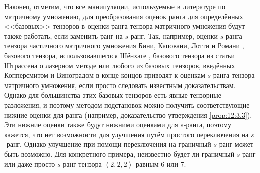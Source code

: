 Наконец, отметим, что все манипуляции, используемые в литературе по матричному умножению, для преобразования оценок ранга для определённых <<базовых>> тензоров в оценки ранга тензора матричного умножения будут также работать, если заменить ранг на $s$-ранг. Так, например, оценки $s$-ранга тензора частичного матричного умножения Бини, Каповани, Лотти и Романи \cite{Bini}, базового тензора, использовавшегося Шёнхаге \cite{Schonhage81}, базового тензора из статьи Штрассена о лазерном методе \cite{Strassen1987} или любого из базовых тензоров, введённых Копперсмитом и Виноградом \cite{Coppersmith:1990} в конце концов приводят к оценкам $s$-ранга тензора матричного умножения, если просто следовать известным доказательствам. Однако для большинства этих базовых тензоров есть явные тензорные разложения, и поэтому методом подстановок можно получить соответствующие нижние оценки для ранга (например, доказательство утверждения \ref{prop:12:3.3}). Эти нижние оценки также будут нижними оценками для $s$-ранга, поэтому кажется, что нет возможности для улучшения путём простого переключения на $s$-ранг. Однако улучшение при помощи переключения на граничный $s$-ранг может быть возможно. Для конкретного примера, неизвестно будет ли граничный $s$-ранг или даже просто $s$-ранг тензора $\left\langle 2,2,2 \right\rangle$ равным 6 или 7.























